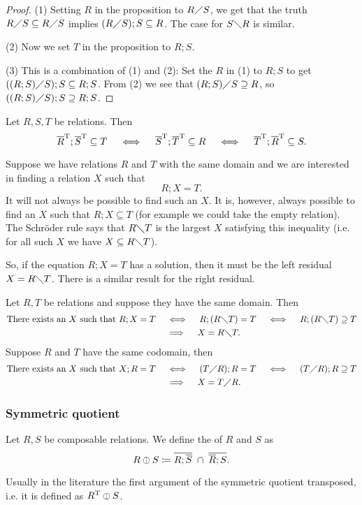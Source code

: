\begin{proof}
(1) Setting $R$ in the proposition to $R\diagup S$, we get that the truth $R\diagup S \subseteq R\diagup S$ implies $(R\diagup S);S \subseteq R$. The case for $S\diagdown R$ is similar.

(2) Now we set $T$ in the proposition to $R;S$.

(3) This is a combination of (1) and (2): Set the $R$ in (1) to $R;S$ to get $((R;S)\diagup S);S \subseteq R;S$. From (2) we see that $(R;S)\diagup S \supseteq R$, so $((R;S)\diagup S);S \supseteq R;S$.
\end{proof}
\begin{corollary}
Let $R,S,T$ be relations. Then
\[ \overline{R}^{\mathrm{T}};\overline{S}^{\mathrm{T}} \subseteq T \quad\iff\quad \overline{S}^{\mathrm{T}};\overline{T}^{\mathrm{T}} \subseteq R \quad\iff\quad \overline{T}^{\mathrm{T}};\overline{R}^{\mathrm{T}} \subseteq S. \]
\end{corollary}

Suppose we have relations $R$ and $T$ with the same domain and we are interested in finding a relation $X$ such that
\[ R;X = T. \]
It will not always be possible to find such an $X$. It is, however, always possible to find an $X$ such that $R;X \subseteq T$ (for example we could take the empty relation). The Schröder rule says that $R\diagdown T$ is the largest $X$ satisfying this inequality (i.e. for all such $X$ we have $X\subseteq R\diagdown T$).

So, if the equation $R;X = T$ has a solution, then it must be the left residual $X = R\diagdown T$. There is a similar result for the right residual.

\begin{corollary}
Let $R,T$ be relations and suppose they have the same domain. Then
\begin{align*}
\text{There exists an $X$ such that $R;X = T$} \quad&\iff\quad R;(R\diagdown T) = T \quad\iff\quad R;(R\diagdown T) \supseteq T \\
&\implies\quad X = R\diagdown T.
\end{align*}
Suppose $R$ and $T$ have the same codomain, then
\begin{align*}
\text{There exists an $X$ such that $X;R = T$} \quad&\iff\quad (T\diagup R);R = T \quad\iff\quad (T\diagup R);R \supseteq T \\
&\implies\quad X = T\diagup R.
\end{align*}
\end{corollary}

\subsubsection{Symmetric quotient}
\begin{definition}
Let $R,S$ be composable relations. We define the  of $R$ and $S$ as
\[ R \mathbin{\obar} S \coloneqq \overline{R;\overline{S}} \;\cap\; \overline{\overline{R};S}. \]
\end{definition}
Usually in the literature the first argument of the symmetric quotient transposed, i.e. it is defined as $R^{\mathrm{T}} \mathbin{\obar} S$.

